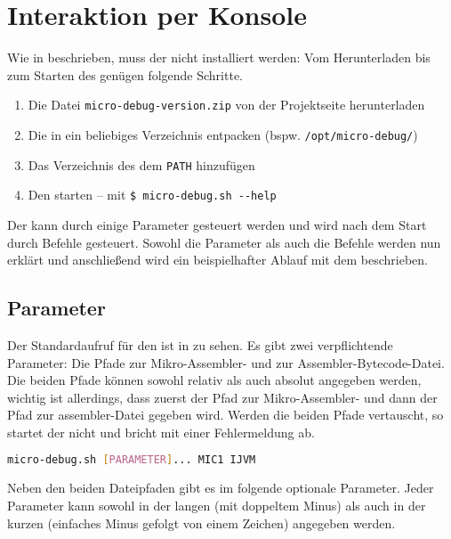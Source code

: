 \chapter{Interaktion per Konsole}
Wie in  beschrieben, muss der \md{} nicht installiert werden: Vom Herunterladen bis zum Starten des \md{} genügen folgende Schritte.

\begin{enumerate}
\item Die Datei \texttt{micro-debug-version.zip} von der Projektseite herunterladen
\item Die  in ein beliebiges Verzeichnis entpacken (bspw. \texttt{/opt/micro-debug/})
\item Das Verzeichnis des \md{} dem \texttt{PATH} hinzufügen
\item Den \md{} starten -- mit \texttt{\$ micro-debug.sh -{}-help}
\end{enumerate}

Der \md{} kann durch einige Parameter gesteuert werden und wird nach dem Start durch Befehle gesteuert. Sowohl die Parameter als auch die Befehle werden nun erklärt und anschließend wird ein beispielhafter Ablauf mit dem \md{} beschrieben.

\section{Parameter}
Der Standardaufruf für den \md{} ist in  zu sehen. Es gibt zwei verpflichtende Parameter: Die Pfade zur Mikro-Assembler- und zur Assembler-Bytecode-Datei. Die beiden Pfade können sowohl relativ als auch absolut angegeben werden, wichtig ist allerdings, dass zuerst der Pfad zur Mikro-Assembler- und dann der Pfad zur assembler-Datei gegeben wird. Werden die beiden Pfade vertauscht, so startet der \md{} nicht und bricht mit einer Fehlermeldung ab.

\begin{lstlisting}[language=sh,caption={Aufruf des \md{} -- Konsolenversion},label=\lstlbl{aufruf-konsolenversion}]
  micro-debug.sh [PARAMETER]... MIC1 IJVM
\end{lstlisting}

Neben den beiden Dateipfaden gibt es im folgende optionale Parameter. Jeder Parameter kann sowohl in der langen (mit doppeltem Minus) als auch in der kurzen (einfaches Minus gefolgt von einem Zeichen) angegeben werden.

